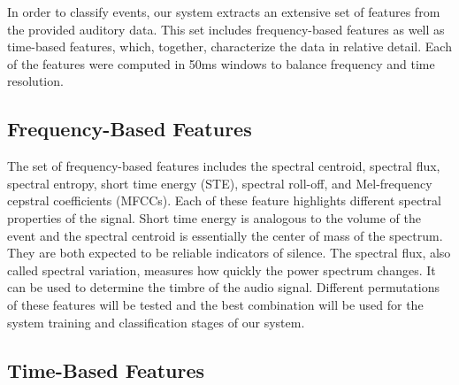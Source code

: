 In order to classify events, our system extracts an extensive set of features from the provided auditory data. This set includes frequency-based features as well as time-based features, which, together, characterize the data in relative detail. Each of the features were computed in 50ms windows to balance frequency and time resolution.

\subsection{Frequency-Based Features}
The set of frequency-based features includes the spectral centroid, spectral flux, spectral entropy, short time energy (STE), spectral roll-off, and Mel-frequency cepstral coefficients (MFCCs).
Each of these feature highlights different spectral properties of the signal.  Short time energy is analogous to the volume of the event and the spectral centroid is essentially the center of mass of the spectrum. They are both expected to be reliable indicators of silence. The spectral flux, also called spectral variation, measures how quickly the power spectrum changes. It can be used to determine the timbre of the audio signal. Different permutations of these features will be tested and the best combination will be used for the system training and classification stages of our system. 

\subsection{Time-Based Features}
